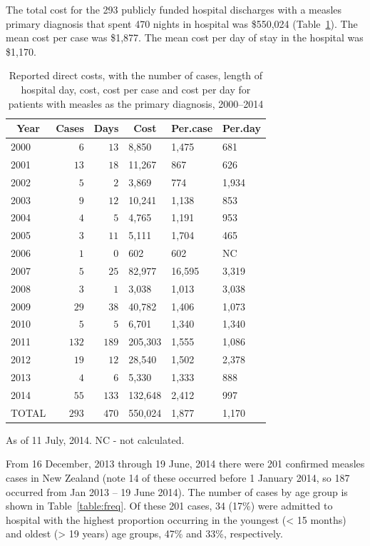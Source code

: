 \documentclass{article}
\begin{document}
The total cost for the 293 publicly funded hospital discharges with a measles primary diagnosis that spent 470 nights in hospital was \$550,024 (Table~\ref{table:hosp}). The mean cost per case was \$1,877. The mean cost per day of stay in the hospital was \$1,170.



\begin{table}
\caption{Reported direct costs, with the number of cases, length of hospital day, cost, cost per case and cost per day for patients with measles as the primary diagnosis, 2000--2014}
\begin{center}
\begin{tabular}{lrrlll}
\hline\hline
\multicolumn{1}{c}{Year}&\multicolumn{1}{c}{Cases}&\multicolumn{1}{c}{Days}&\multicolumn{1}{c}{Cost}&\multicolumn{1}{c}{Per.case}&\multicolumn{1}{c}{Per.day}\tabularnewline
\hline
2000&$  6$&$ 13$&8,850&1,475&681\tabularnewline
2001&$ 13$&$ 18$&11,267&867&626\tabularnewline
2002&$  5$&$  2$&3,869&774&1,934\tabularnewline
2003&$  9$&$ 12$&10,241&1,138&853\tabularnewline
2004&$  4$&$  5$&4,765&1,191&953\tabularnewline
2005&$  3$&$ 11$&5,111&1,704&465\tabularnewline
2006&$  1$&$  0$&602&602&NC\tabularnewline
2007&$  5$&$ 25$&82,977&16,595&3,319\tabularnewline
2008&$  3$&$  1$&3,038&1,013&3,038\tabularnewline
2009&$ 29$&$ 38$&40,782&1,406&1,073\tabularnewline
2010&$  5$&$  5$&6,701&1,340&1,340\tabularnewline
2011&$132$&$189$&205,303&1,555&1,086\tabularnewline
2012&$ 19$&$ 12$&28,540&1,502&2,378\tabularnewline
2013&$  4$&$  6$&5,330&1,333&888\tabularnewline
2014&$ 55$&$133$&132,648&2,412&997\tabularnewline
TOTAL&$293$&$470$&550,024&1,877&1,170\tabularnewline
\hline
\end{tabular}\end{center}\label{table:hosp}
 \centering
 \begin{tablenotes}
      \small
      \item As of 11 July, 2014. NC - not calculated.
    \end{tablenotes}
\end{table}

From 16 December, 2013 through 19 June, 2014 there were 201 confirmed measles cases in New Zealand (note 14 of these occurred before 1 January 2014, so 187 occurred from Jan 2013 -- 19 June 2014). The number of cases by age group is shown in Table~\ref{table:freq}. Of these 201 cases, 34 (17\%) were admitted to hospital with the highest proportion occurring in the youngest (< 15 months) and oldest (> 19 years) age groups, 47\% and 33\%, respectively.
\end{document}
